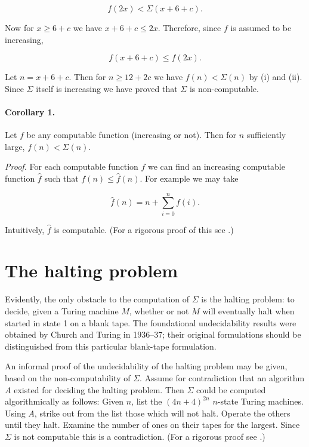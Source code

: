 \documentclass[11pt]{article}
\begin{document}
\begin{equation*}
f(2 x)<\Sigma(x+6+c) . \tag{i}
\end{equation*}


Now for $x \geq 6+c$ we have $x+6+c \leq 2 x$. Therefore, since $f$ is assumed to be increasing,


\begin{equation*}
f(x+6+c) \leq f(2 x) . \tag{ii}
\end{equation*}


Let $n=x+6+c$. Then for $n \geq 12+2 c$ we have $f(n)<\Sigma(n)$ by (i) and (ii). Since $\Sigma$ itself is increasing we have proved that $\Sigma$ is non-computable.

\paragraph{Corollary 1.} Let $f$ be any computable function (increasing or not). Then for $n$ sufficiently large, $f(n)<\Sigma(n)$.

\emph{Proof.} For each computable function $f$ we can find an increasing computable function $\hat{f}$ such that $f(n) \leq \hat{f}(n)$. For example we may take

\[
\hat{f}(n)=n+\sum_{i=0}^{n} f(i) .
\]

Intuitively, $\hat{f}$ is computable. (For a rigorous proof of this see \cite[p.~224]{r18}.)
\section{The halting problem}
Evidently, the only obstacle to the computation of $\Sigma$ is the halting problem: to decide, given a Turing machine $M$, whether or not $M$ will eventually halt when started in state 1 on a blank tape. The foundational undecidability results were obtained by Church \cite{r6} and Turing \cite{r42} in 1936--37; their original formulations should be distinguished from this particular blank-tape formulation.

An informal proof of the undecidability of the halting problem may be given, based on the non-computability of $\Sigma$. Assume for contradiction that an algorithm $A$ existed for deciding the halting problem. Then $\Sigma$ could be computed algorithmically as follows: Given $n$, list the $(4n+4)^{2n}$ $n$-state Turing machines. Using $A$, strike out from the list those which will not halt. Operate the others until they halt. Examine the number of ones on their tapes for the largest. Since $\Sigma$ is not computable this is a contradiction. (For a rigorous proof see \cite{r18}.)
\end{document}
